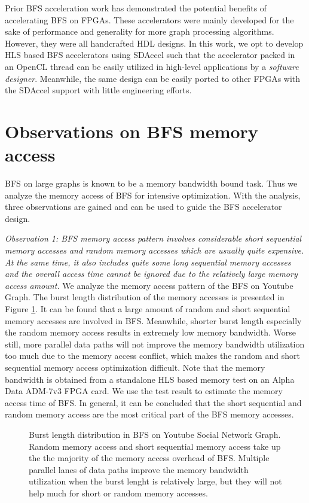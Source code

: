 Prior BFS acceleration work has demonstrated the potential benefits of accelerating 
BFS on FPGAs. These accelerators were mainly developed for the sake 
of performance and generality for more graph processing algorithms. 
However, they were all handcrafted HDL designs. In this work, 
we opt to develop HLS based BFS accelerators 
using SDAccel such that the accelerator packed in an 
OpenCL thread can be easily utilized in high-level applications 
by a \textit{software designer}. Meanwhile, the same design can be easily 
ported to other FPGAs with the SDAccel support with little 
engineering efforts.

\section{Observations on BFS memory access} \label{sec:observation}
BFS on large graphs is known to be a memory bandwidth bound task.
Thus we analyze the memory access of BFS for intensive optimization.
With the analysis, three observations are gained and can be used to
guide the BFS accelerator design.

\textit{Observation 1: BFS memory access pattern  
	involves considerable short sequential memory accesses 
	and random memory accesses which are usually quite 
	expensive. At the same time, it also includes quite some long 
	sequential memory accesses and the overall access time cannot be 
ignored due to the relatively large memory access amount.} We analyze the 
memory access pattern of the BFS on Youtube Graph. The burst length distribution 
of the memory accesses is presented in Figure \ref{fig:burst-len-youtube}. 
It can be found that a large amount of random and short sequential 
memory accesses are involved in BFS. Meanwhile, shorter burst length especially 
the random memory access results in extremely low memory bandwidth. Worse still, 
more parallel data paths will not improve the memory bandwidth 
utilization too much due to the memory 
access conflict, which makes the random and short sequential 
memory access optimization difficult. Note that the memory bandwidth is obtained 
from a standalone HLS based memory test on an Alpha Data ADM-7v3 FPGA card.
We use the test result to estimate the memory access time of BFS. 
In general, it can be concluded that the short sequential and random 
memory access are the most critical part of the BFS memory accesses. 

\begin{figure}
	\caption{Burst length distribution in BFS on Youtube Social Network Graph. 
		Random memory access and short sequential memory access take up the 
		the majority of the memory access overhead of BFS. Multiple parallel 
		lanes of data paths improve the memory bandwidth utilization when the 
		burst lenght is relatively large, but they will not help much 
	for short or random memory accesses.}
	\label{fig:burst-len-youtube}
	\vspace{-1.5em}
\end{figure}

